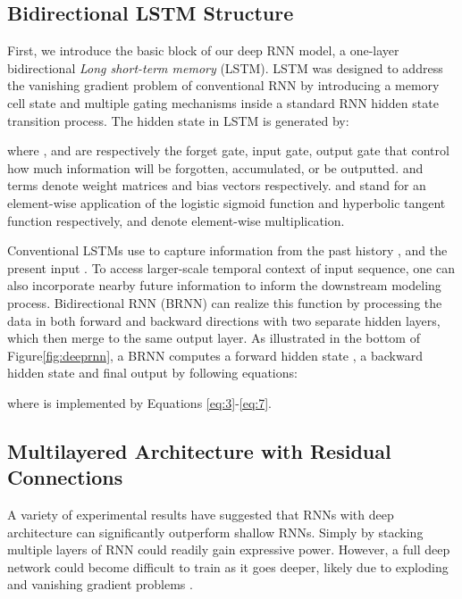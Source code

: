\documentclass[letterpaper, 10 pt, conference]{ieeeconf}
\begin{document}
\subsection{Bidirectional LSTM Structure}
First, we introduce the basic block of our deep RNN model, a one-layer bidirectional \textit{Long short-term memory }(LSTM).
LSTM \cite{hochreiter1997long} was designed to address the vanishing gradient problem of conventional RNN by introducing a memory cell state  and multiple gating mechanisms inside a standard RNN hidden state transition process.
The hidden state  in LSTM is generated by:

where ,  and   are respectively the forget gate, input gate, output gate that control how much information will be forgotten, accumulated, or be outputted.
 and  terms denote weight matrices and bias vectors respectively.
 and  stand for an element-wise application of the logistic sigmoid function and hyperbolic tangent function respectively, and {} denote element-wise multiplication. 


Conventional LSTMs use  to capture information from the past history , and the present input .
To access larger-scale temporal context of input sequence, one can also incorporate nearby future information  to inform the downstream modeling process.
Bidirectional RNN (BRNN) \cite{schuster1997bidirectional} can realize this function by processing the data in both forward and backward directions with two separate hidden layers, which then merge to the same output layer. 
As illustrated in the bottom of Figure\ref{fig:deeprnn}, a BRNN computes a forward hidden state , a backward hidden state  and final output   by following equations:

where  is implemented by Equations \ref{eq:3}-\ref{eq:7}.



\subsection{Multilayered Architecture with Residual Connections}
A variety of experimental results \cite{graves2013speech}\cite{amodei2016deep} have suggested that RNNs with deep architecture can significantly outperform shallow RNNs.
Simply by stacking multiple layers of RNN could readily gain expressive power. However, a full deep network could become difficult to train as it goes deeper, likely due to exploding and vanishing gradient problems \cite{pascanu2013difficulty}.
\end{document}
